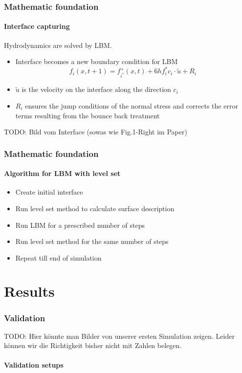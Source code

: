 \documentclass[ucs]{beamer}
\begin{document}
\begin{frame}
\frametitle{Mathematic foundation}
\framesubtitle{Interface capturing}
Hydrodynamics are solved by LBM.
\begin{itemize}
\item<1-> Interface becomes a new boundary condition for LBM
$$f_i(x,t+1) = f_{i^*}^{+}(x,t) + 6hf_{i}^{*}c_i \cdot \tilde{u} + R_i$$
\item<2-> $\tilde{u}$ is the velocity on the interface along the direction $c_i$
\item<3-> $R_i$ ensures the jump conditions of the normal stress and corrects the error terms resulting from the bounce back treatment
\end{itemize}
TODO: Bild vom Interface (sowas wie Fig.1-Right im Paper)
\end{frame}

\begin{frame}
\end{frame}

\begin{frame}
\frametitle{Mathematic foundation}
\framesubtitle{Algorithm for LBM with level set}
\begin{itemize}
\item<1-> Create initial interface
\item<2-> Run level set method to calculate surface description
\item<3-> Run LBM for a prescribed number of steps
\item<4-> Run level set method for the same number of steps
\item<5-> Repeat till end of simulation
\end{itemize}
\end{frame}

\section{Results}
\begin{frame}
\frametitle{Validation}
TODO: Hier könnte man Bilder von unserer ersten Simulation zeigen. Leider können wir die Richtigkeit bisher nicht mit Zahlen belegen.
\framesubtitle{Validation setups}
\end{frame}
\end{document}
